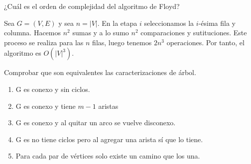 \documentclass[twoside]{article}
\begin{document}
\begin{ejercicio}{2.4}
¿Cuál es el orden de complejidad del algoritmo de Floyd?
\end{ejercicio}
\begin{solucion}
Sea $G=(V,E)$ y sea $n=|V|$. En la etapa $i$ seleccionamos la $i$-ésima fila  y columna. Hacemos $n^2$ sumas y a lo sumo $n^2$ comparaciones y sutituciones. Este proceso se realiza para las $n$ filas, luego tenemos $2n^3$ operaciones. Por tanto, el algoritmo es $O(|V|^3)$.
\end{solucion}
\newpage

\begin{ejercicio}{2.5}
Comprobar que son equivalentes las caracterizaciones de árbol.
\begin{enumerate}
\item G es conexo y sin ciclos.
\item G es conexo y tiene $m-1$ aristas
\item G es conexo y al quitar un arco se vuelve disconexo.
\item G es no tiene ciclos pero al agregar una arista sí que lo tiene.
\item Para cada par de vértices solo existe un camino que los una.
\end{enumerate}
\end{ejercicio}
\end{document}
